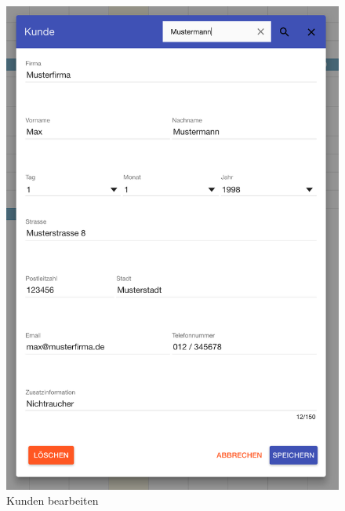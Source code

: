 \begin{figure}[H]
    \begin{minipage}[t]{0.49\linewidth}
        \centering
        \includegraphics[width=\linewidth]{images/frontend_customer_edit.png}
        \caption{Kunden bearbeiten}
    \end{minipage}
\end{figure}




